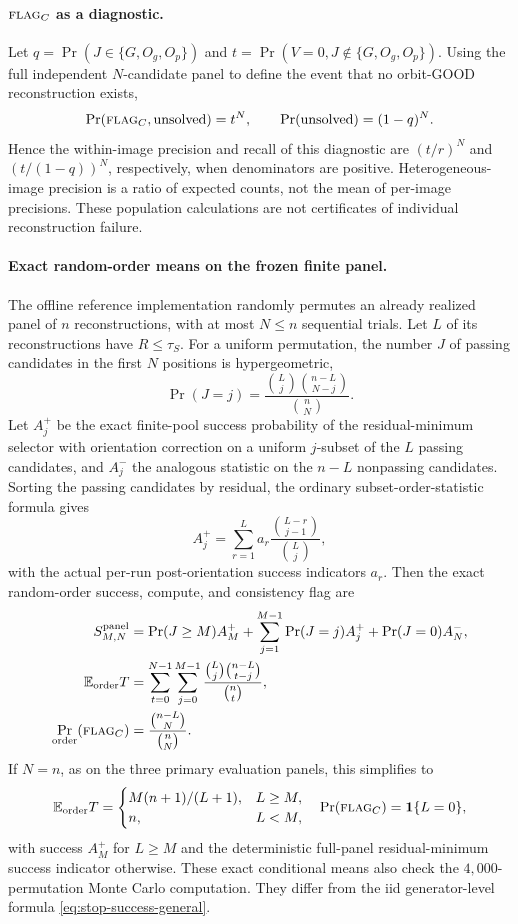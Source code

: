 \paragraph{$\textsc{flag}_C$ as a diagnostic.}
Let $q=\Pr(J\in\{G,O_g,O_p\})$ and
$t=\Pr(V=0,J\notin\{G,O_g,O_p\})$.
Using the full independent $N$-candidate panel to define the event
that no orbit-GOOD reconstruction exists,
\[
 \Pr(\textsc{flag}_C,\text{unsolved})=t^N,\qquad
 \Pr(\text{unsolved})=(1-q)^N.
\]
Hence the within-image precision and recall of this diagnostic are
$(t/r)^N$ and $(t/(1-q))^N$, respectively, when denominators are
positive. Heterogeneous-image precision is a ratio of expected counts,
not the mean of per-image precisions. These population calculations
are not certificates of individual reconstruction failure.

\paragraph{Exact random-order means on the frozen finite panel.}
The offline reference implementation randomly permutes an already
realized panel of $n$ reconstructions, with at most $N\le n$
sequential trials. Let $L$ of its reconstructions have $R\le\tau_S$.
For a uniform permutation, the number $J$ of passing candidates in
the first $N$ positions is hypergeometric,
\[
 \Pr(J=j)=\frac{\binom Lj\binom{n-L}{N-j}}{\binom nN}.
\]
Let $A_j^+$ be the exact finite-pool success probability of the
residual-minimum selector with orientation correction on a uniform
$j$-subset of the $L$ passing candidates, and $A_j^-$ the analogous
statistic on the $n-L$ nonpassing candidates. Sorting the passing
candidates by residual, the ordinary subset-order-statistic formula
gives
\[
 A_j^+=\sum_{r=1}^{L}a_r\frac{\binom{L-r}{j-1}}{\binom Lj},
\]
with the actual per-run post-orientation success indicators $a_r$.
Then the exact random-order success, compute, and consistency flag are
\begin{align}
 S^{\mathrm{panel}}_{M,N}
 &=\Pr(J\ge M)A_M^+
 +\sum_{j=1}^{M-1}\Pr(J=j)A_j^++\Pr(J=0)A_N^-,\\
 \mathbb E_{\mathrm{order}}T
 &=\sum_{t=0}^{N-1}\sum_{j=0}^{M-1}
   \frac{\binom Lj\binom{n-L}{t-j}}{\binom nt},\\
 \Pr_{\mathrm{order}}(\textsc{flag}_C)
 &=\frac{\binom{n-L}{N}}{\binom nN}.
\end{align}
If $N=n$, as on the three primary evaluation panels, this
simplifies to
\[
 \mathbb E_{\mathrm{order}}T
 =\begin{cases}M(n+1)/(L+1),&L\ge M,\\n,&L<M,\end{cases}
 \quad
 \Pr(\textsc{flag}_C)=\mathbf1\{L=0\},
\]
with success $A_M^+$ for $L\ge M$ and the deterministic full-panel
residual-minimum success indicator otherwise. These exact conditional means also check the $4{,}000$-permutation
Monte Carlo computation. They differ from the iid generator-level formula
\eqref{eq:stop-success-general}.

